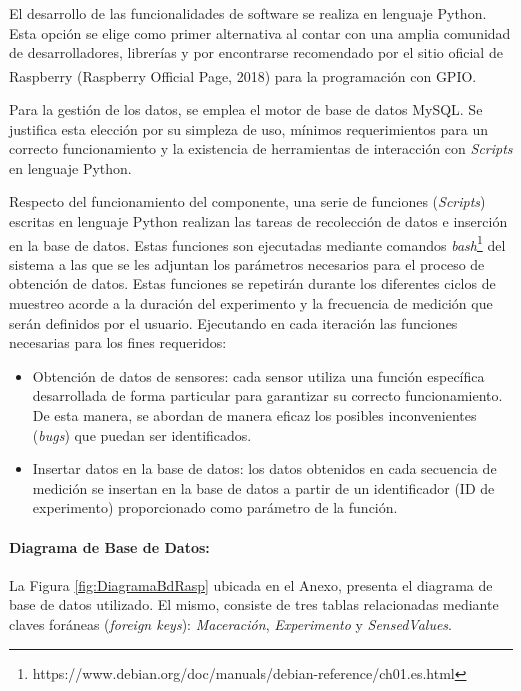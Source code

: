                \par El desarrollo de las funcionalidades de software se realiza en lenguaje Python. Esta opción se elige como primer alternativa al contar con una amplia comunidad de desarrolladores, librerías y por encontrarse recomendado por el sitio oficial de Raspberry\textsuperscript{\textregistered} (Raspberry\textsuperscript{\textregistered} Official Page, 2018) para la programación con GPIO.
                
               \par Para la gestión de los datos, se emplea el motor de base de datos MySQL. Se justifica esta elección por su simpleza de uso, mínimos requerimientos para un correcto funcionamiento y la existencia de herramientas de interacción con \textit{Scripts} en lenguaje Python.
                
               \par Respecto del funcionamiento del componente, una serie de funciones (\textit{Scripts}) escritas en lenguaje Python realizan las tareas de recolección de datos e inserción en la base de datos. Estas funciones son ejecutadas mediante comandos \textit{bash}\footnote{https://www.debian.org/doc/manuals/debian-reference/ch01.es.html} del sistema a las que se les adjuntan los parámetros necesarios para el proceso de obtención de datos. Estas funciones se repetirán durante los diferentes ciclos de muestreo acorde a la duración del experimento y la frecuencia de medición que serán definidos por el usuario. Ejecutando en cada iteración las funciones necesarias para los fines requeridos:
                    
                    \begin{itemize}
                        \item Obtención de datos de sensores: cada sensor utiliza una función específica desarrollada de forma particular para garantizar su correcto funcionamiento. De esta manera, se abordan de manera eficaz los posibles inconvenientes (\textit{bugs}) que puedan ser identificados.
                        
                        \item Insertar datos en la base de datos: los datos obtenidos en cada secuencia de medición se insertan en la base de datos a partir de un identificador (ID de experimento) proporcionado como parámetro de la función.
                    \end{itemize}
                
               \paragraph{Diagrama de Base de Datos:} La Figura \ref{fig:DiagramaBdRasp} ubicada en el Anexo, presenta el diagrama de base de datos utilizado. El mismo, consiste de tres tablas relacionadas mediante claves foráneas (\textit{foreign keys}): \textit{Maceración}, \textit{Experimento} y \textit{SensedValues}. 
                
